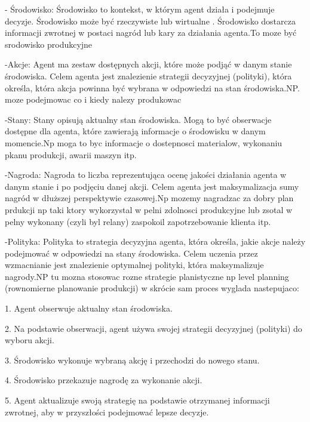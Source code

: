 - Środowisko: Środowisko to kontekst, w którym agent działa i podejmuje decyzje. Środowisko może być rzeczywiste  lub wirtualne . Środowisko dostarcza informacji zwrotnej w postaci nagród lub kary za działania agenta.To moze być srodowisko produkcyjne

-Akcje: Agent ma zestaw dostępnych akcji, które może podjąć w danym stanie środowiska. Celem agenta jest znalezienie strategii decyzyjnej (polityki), która określa, która akcja powinna być wybrana w odpowiedzi na stan środowiska.NP. moze podejmowac co i kiedy nalezy produkowac

-Stany: Stany opisują aktualny stan środowiska. Mogą to być obserwacje dostępne dla agenta, które zawierają informacje o środowisku w danym momencie.Np moga to byc informacje o dostepnosci materialow, wykonaniu pkanu produkcji, awarii maszyn itp.

-Nagroda: Nagroda to liczba reprezentująca ocenę jakości działania agenta w danym stanie i po podjęciu danej akcji. Celem agenta jest maksymalizacja sumy nagród w dłuższej perspektywie czasowej.Np mozemy nagradzac za dobry plan prdukcji np taki ktory wykorzystal w pelni zdolnosci produkcyjne lub zsotal w pelny wykonany (czyli byl relany) zaspokoil zapotrzebowanie klienta itp.

-Polityka: Polityka to strategia decyzyjna agenta, która określa, jakie akcje należy podejmować w odpowiedzi na stany środowiska. Celem uczenia przez wzmacnianie jest znalezienie optymalnej polityki, która maksymalizuje nagrody.NP tu mozna stosowac rozne strategie planistyczne np level planning (rownomierne planowanie produkcji)
 \vspace{\baselineskip} 
w skrócie sam proces wyglada nastepujaco:

   1. Agent obserwuje aktualny stan środowiska.
   
   2. Na podstawie obserwacji, agent używa swojej strategii decyzyjnej (polityki) do wyboru akcji.
   
  3.  Środowisko wykonuje wybraną akcję i przechodzi do nowego stanu.
  
 4.   Środowisko przekazuje nagrodę za wykonanie akcji.
 
   5.  Agent aktualizuje swoją strategię na podstawie otrzymanej informacji zwrotnej, aby w przyszłości podejmować lepsze decyzje.
   \vspace{\baselineskip} 

